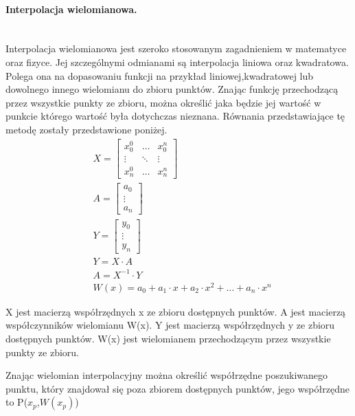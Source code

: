 \paragraph{Interpolacja wielomianowa.\newline}\\
Interpolacja wielomianowa jest szeroko stosowanym zagadnieniem w matematyce oraz fizyce. Jej szczególnymi odmianami są interpolacja liniowa oraz kwadratowa. Polega ona na dopasowaniu funkcji na przykład liniowej,kwadratowej lub dowolnego innego wielomianu do zbioru punktów. Znając funkcję przechodzącą przez wszystkie punkty ze zbioru, można określić jaka będzie jej wartość w punkcie którego wartość była dotychczas nieznana. Równania przedstawiające tę metodę zostały przedstawione poniżej.
\begin{equation}
    \begin{aligned}
            &X=\begin{bmatrix}
                    x_{0}^0 &\dots & x_{0}^n\\
                     \vdots  & \ddots & \vdots \\
                    x_{n}^0 &\dots & x_{n}^n
                \end{bmatrix}\\
            &A=\begin{bmatrix}
                    a_{0}\\
                      \vdots \\
                    a_{n}
                \end{bmatrix}\\
            &Y=\begin{bmatrix}
                y_{0}\\
                  \vdots \\
                y_{n}
            \end{bmatrix}\\
            &Y=X \cdot A\\
            &A=X^{-1} \cdot Y\\
            & W(x)=a_{0}+a_{1}\cdot x +a_{2}\cdot x^2+\ldots +a_{n}\cdot x^n
    \end{aligned}
    \label{equ:wielomianowaEqu}
\end{equation}

X jest macierzą współrzędnych x ze zbioru dostępnych punktów. A jest macierzą współczynników wielomianu W(x). Y jest macierzą współrzędnych y ze zbioru dostępnych punktów. W(x) jest wielomianem przechodzącym przez wszystkie punkty ze zbioru.

Znając wielomian interpolacyjny można określić współrzędne poszukiwanego punktu, który znajdował się poza zbiorem dostępnych punktów, jego współrzędne to P($x_{p}$,$W(x_{p})$)
